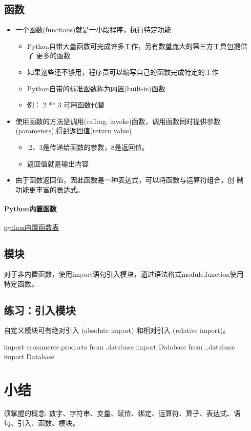 \subsection{函数}
\begin{itemize}
\item 一个函数(functions)就是一小段程序，执行特定功能
  \begin{itemize}
  \item Python自带大量函数可完成许多工作，另有数量庞大的第三方工具包提供了
    更多的函数
  \item 如果这些还不够用，程序员可以编写自己的函数完成特定的工作
  \item Python自带的标准函数称为内置(built-in)函数
  \item 例： 2 ** 3 可用函数代替
  \end{itemize}
\item 使用函数的方法是调用(calling, invoke)函数，调用函数同时提供参数
  (parameters),得到返回值(return value)
  \begin{itemize}
  \item {},2、3是传递给函数的参数，8是返回值。 
  \item {}返回值就是输出内容
  \end{itemize}
\item 由于函数返回值，因此函数是一种表达式，可以将函数与运算符组合，创
  制功能更丰富的表达式。 
\end{itemize}

\paragraph{Python内置函数}
\href{https://docs.python.org/3/library/functions.html}{python内置函数表}
\subsection{模块}
对于非内置函数，使用import语句引入模块，通过语法格式module.function使用特定函数。
\subsection{练习：引入模块}
自定义模块可有绝对引入 (absolute import) 和相对引入 (relative import)。
\begin{python}
  import ecommerce.products
  from .database import Database
  from ..database import Database
\end{python}

\section{小结}
须掌握的概念: 数字、字符串、变量、赋值、绑定、运算符、算子、表达式、语句、引入、函数、模块。


